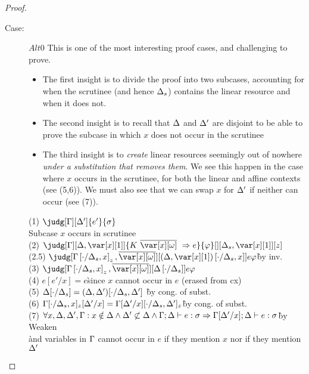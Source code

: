 \begin{proof}
\begin{description}
\item[Case:] $Alt0$
    This is one of the most interesting proof cases, and challenging to prove.
        \begin{itemize}
            \item The first insight is to divide the proof into two subcases, accounting
                for when the scrutinee (and hence $\Delta_s$) contains the linear resource and when it does not.
            \item The second insight is to recall that $\Delta$ and $\Delta'$ are
                disjoint to be able to prove the subcase in which $x$ does not
                occur in the scrutinee
            \item The third insight is to \emph{create} linear resources
                seemingly out of nowhere \emph{under a substitution that
                removes them}. We see this happen in the case where $x$ occurs
                in the scrutinee, for both the linear and affine contexts (see (5,6)).
                We must also see that we can swap $x$ for $\Delta'$ if neither can occur (see (7)).
        \end{itemize}
\begin{tabbing}
  (1) $\judg[\G][\D']{e'}{\s}$\\
  Subcase $x$ occurs in scrutinee\\
    (2) $\judg[\G][\D,\xl]{K~\ov{\xo}~\Rightarrow e}{\vp}[][\D_s,\xl][z]$\\
    (2.5) $\judg[\subst{\G}{\cdot}{\D_s,x}_z,\ov{\xo}][\subst{(\D,\xl)}{\cdot}{\D_s,x}]{e}{\vp}$\`by inv.\\
    (3) $\judg[\subst{\G}{\cdot}{\D_s,x}_z,\ov{\xo}][\subst{\D}{\cdot}{\D_s}]{e}{\vp}$\\
    (4) $e[e'/x] = e$\` since $x$ cannot occur in $e$ (erased from cx)\\
    (5) $\Delta[\cdot/\Delta_s] = (\Delta,\Delta')[\cdot/\Delta_s,\Delta']$   \` by cong. of subst.\\
    (6) $\Gamma[\cdot/\Delta_s,x]_z[\Delta'/x] = \Gamma[\Delta'/x][\cdot/\Delta_s,\Delta']_z$\` by cong. of subst.\\%
    (7) $\forall x,\Delta,\Delta',\Gamma:x\notin\Delta \land \Delta'\not\subset\Delta \land \Gamma;\Delta \vdash e :\sigma \Rightarrow \Gamma[\Delta'/x];\Delta \vdash e : \sigma$\` by Weaken\\
    \` and variables in $\Gamma$ cannot occur in $e$ if they mention $x$ nor if they mention $\Delta'$ \\

\end{tabbing}
\end{description}
\end{proof}
